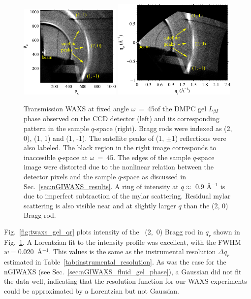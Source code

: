 \begin{figure}[htbp]
  \centering
  \includegraphics[width=0.44\textwidth]{figures/ripple/tWAXS/twaxs_gel_ccd}
  \includegraphics[width=0.54\textwidth]{figures/ripple/tWAXS/twaxs_gel_q}
  \caption[Transmission WAXS at fixed angle $\omega$~=~45\textdegree of the DMPC gel 
  $L_{\beta I}$ phase observed on
  the CCD detector (left) and its corresponding pattern in the sample $q$-space
  (right)]
  {Transmission WAXS at fixed angle $\omega$~=~45\textdegree of the DMPC gel 
  $L_{\beta I}$ phase observed on
  the CCD detector (left) and its corresponding pattern in the sample $q$-space
  (right). Bragg rods were indexed as (2, 0), (1, 1) and (1, -1). The satellite 
  peaks of (1, $\pm$1) reflections were also labeled. The black region in
  the right image corresponds to inaccesible $q$-space at 
  $\omega$~=~45\textdegree. The edges
  of the sample $q$-space image were distorted due to the nonlinear relation
  between the detector pixels and the sample $q$-space as discussed in 
  Sec.~\ref{sec:nGIWAXS_results}. A ring of intensity
  at $q \approx$ 0.9 \AA$^{-1}$ is due to imperfect subtraction of the mylar
  scattering. Residual mylar scattering is also visible near and at slightly 
  larger $q$ than the (2, 0) Bragg rod.}
  \label{fig:twaxs_gel}
\end{figure}

Fig.~\ref{fig:twaxs_gel_qr} plots intensity of the \LbetaI\ (2,~0) Bragg rod in $q_r$
shown in Fig.~\ref{fig:twaxs_gel}. A Lorentzian fit to the intensity profile was excellent, 
with the FWHM $w=0.020$~\AA$^{-1}$. This values is the same as the instrumental resolution
$\Delta q_r$ estimated in Table~\ref{tab:instrumental_resolution}. As was the case 
for the nGIWAXS (see Sec.~\ref{sec:nGIWAXS_fluid_gel_phase}), a Gaussian did not
fit the data well, indicating that the resolution function for our
WAXS experiments could be approximated by a Lorentzian but not Gaussian.

